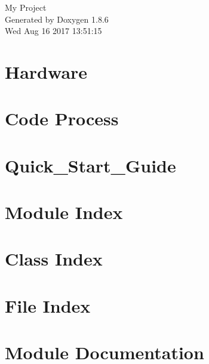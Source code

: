 \documentclass[twoside]{book}
\newcommand{\clearemptydoublepage}{%
  \newpage{\pagestyle{empty}\cleardoublepage}%
}
\begin{document}
\hypersetup{pageanchor=false}
\begin{titlepage}
\vspace*{7cm}
\begin{center}%
{\Large My Project }\\
\vspace*{1cm}
{\large Generated by Doxygen 1.8.6}\\
\vspace*{0.5cm}
{\small Wed Aug 16 2017 13:51:15}\\
\end{center}
\end{titlepage}
\clearemptydoublepage
\tableofcontents
\clearemptydoublepage
{}
\hypersetup{pageanchor=true}

\chapter{Hardware}
\label{md_doc_Environment}
\hypertarget{md_doc_Environment}{}

\chapter{Code Process}
\label{md_doc_Guide}
\hypertarget{md_doc_Guide}{}

\chapter{Quick\-\_\-\-Start\-\_\-\-Guide}
\label{md_doc_Quick_Start_Guide}
\hypertarget{md_doc_Quick_Start_Guide}{}

\chapter{Module Index}

\chapter{Class Index}

\chapter{File Index}

\chapter{Module Documentation}









\end{document}
